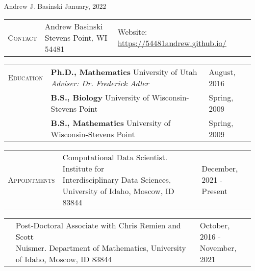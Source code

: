 \documentclass[11pt]{article}
\newcommand{\cellone}{3.5cm} %
\newcommand{\celltwo}{11cm}
\newcommand{\cellthree}{4cm}
\newcommand{\incellone}{3cm}
\newcommand{\incelltwo}{5cm}
\newcommand{\incellthree}{10cm}
\newcommand{\spa}{\vspace{.4in}}
\begin{document}
{\huge Andrew J. Basinski \hspace{2.5in} January, 2022}

\noindent\makebox[\linewidth]{\rule{\linewidth}{0.4pt}}

\spa

\begin{tabularx}{\textwidth}{p{\incellone} p{\incelltwo} p{\incellthree}}

  C\textsc{ontact} & \parbox[t]{5 cm}{Andrew Basinski \\ Stevens Point, WI 54481} & \parbox[t]{8cm}{%
    Website: \url{https://54481andrew.github.io/}
  } \\

\end{tabularx}

\spa

\begin{tabularx}{\textwidth}{p{\cellone} p{\celltwo} p{\cellthree}}
E\textsc{ducation} & \parbox[t]{\celltwo}{{\bf Ph.D., Mathematics} University of Utah \\  \emph{Adviser: Dr. Frederick Adler}} &  August, 2016 \\[.5in]   

		          & \parbox[t][0cm]{13cm}{{\bf B.S., Biology} University of Wisconsin-Stevens Point} & Spring, 2009 \\
		          & \parbox[t]{13cm}{{\bf B.S., Mathematics} University of Wisconsin-Stevens Point} & Spring, 2009 \\
\end{tabularx} 

\spa

\begin{tabularx}{\textwidth}{p{\cellone} p{\celltwo} p{\cellthree}}
  \parbox[t][0cm]{\cellone}{A\textsc{ppointments}}  & \parbox[t]{10cm}{Computational Data Scientist. Institute for \\Interdisciplinary Data Sciences, University of Idaho, Moscow, ID 83844} & \parbox[t][]{\cellthree}{December, 2021 - \\ Present}
\end{tabularx}

\spa

\begin{tabularx}{\textwidth}{p{\cellone} p{\celltwo} p{\cellthree}}
  \parbox[t][0cm]{\cellone}{}  & \parbox[t]{10cm}{Post-Doctoral Associate with Chris Remien and Scott \\ Nuismer. Department of Mathematics, University of Idaho, Moscow, ID 83844} & \parbox[t][]{\cellthree}{October, 2016 - \\ November, 2021}
\end{tabularx}
\end{document}
